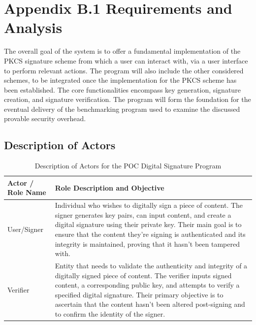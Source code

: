 \documentclass[]{final_report}
\theoremstyle{definition}
\begin{document}
\section{Appendix B.1 Requirements and Analysis}
The overall goal of the system is to offer a fundamental implementation of the PKCS signature scheme from which a user can interact with, via a user interface to perform relevant actions. The program will also include the other considered schemes, to be integrated once the implementation for the PKCS scheme has been established.
The core functionalities encompass key generation, signature creation, and signature verification.
The program will form the foundation for the eventual delivery of the benchmarking program used to examine the discussed provable security overhead.

\subsection{Description of Actors}
\begin{table}[H]
    \centering
    \caption{Description of Actors for the POC Digital Signature Program}
    \label{tab:actors_description}
    \begin{tabular}{|l|p{10cm}|}
    \hline
    \textbf{Actor / Role Name} & \textbf{Role Description and Objective} \\
    \hline
    User/Signer & Individual who wishes to digitally sign a piece of content. The signer generates key pairs, can input content, and create a digital signature using their private key. Their main goal is to ensure that the content they're signing is authenticated and its integrity is maintained, proving that it hasn't been tampered with. \\
    \hline
    Verifier & Entity that needs to validate the authenticity and integrity of a digitally signed piece of content. The verifier inputs signed content, a corresponding public key, and attempts to verify a specified digital signature. Their primary objective is to ascertain that the content hasn't been altered post-signing and to confirm the identity of the signer. \\
    \hline
    \end{tabular}
\end{table}
\end{document}
